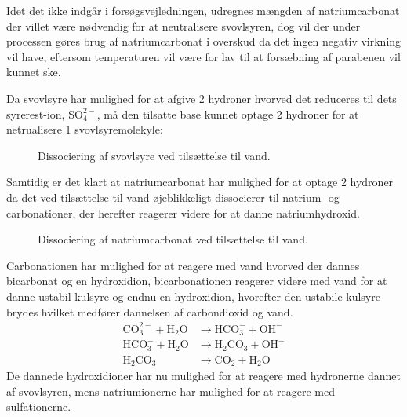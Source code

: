     Idet det ikke indgår i forsøgsvejledningen, udregnes mængden af natriumcarbonat der villet være nødvendig for at neutralisere svovlsyren, dog vil der under processen gøres brug af natriumcarbonat i overskud da det ingen negativ virkning vil have, eftersom temperaturen vil være for lav til at forsæbning af parabenen vil kunnet ske.

    Da svovlsyre har mulighed for at afgive 2 hydroner hvorved det reduceres til dets syrerest-ion, $\mathrm{SO_4^{2-}}$, må den tilsatte base kunnet optage 2 hydroner for at netrualisere 1 svovlsyremolekyle:
    \begin{figure}[H]
        \caption{Dissociering af svovlsyre ved tilsættelse til vand.}
    \end{figure}
    Samtidig er det klart at natriumcarbonat har mulighed for at optage 2 hydroner da det ved tilsættelse til vand øjeblikkeligt dissocierer til natrium- og carbonationer, der herefter reagerer videre for at danne natriumhydroxid.
    \begin{figure}[H]
        \caption{Dissociering af natriumcarbonat ved tilsættelse til vand.}
    \end{figure}
    Carbonationen har mulighed for at reagere med vand hvorved der dannes bicarbonat og en hydroxidion, bicarbonationen reagerer videre med vand for at danne ustabil kulsyre og endnu en hydroxidion, hvorefter den ustabile kulsyre brydes hvilket medfører dannelsen af carbondioxid og vand. 
    \begin{align}
        \mathrm{CO_3^{2-} + H_2O} &\longrightarrow \mathrm{HCO_3^- + OH^-} \\
        \mathrm{HCO_3^- + H_2O} &\longrightarrow \mathrm{H_2CO_3 + OH^-} \\
        \mathrm{H_2CO_3} &\longrightarrow \mathrm{CO_2 + H_2O}
    \end{align}
    De dannede hydroxidioner har nu mulighed for at reagere med hydronerne dannet af svovlsyren, mens natriumionerne har mulighed for at reagere med sulfationerne.
